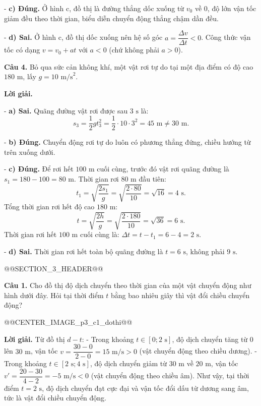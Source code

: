\documentclass[11pt,a4paper]{article}
\begin{document}
- \textbf{c) Đúng.} Ở hình c, đồ thị là đường thẳng dốc xuống từ $v_0$ về 0, độ lớn vận tốc giảm đều theo thời gian, biểu diễn chuyển động thẳng chậm dần đều.

- \textbf{d) Sai.} Ở hình c, đồ thị dốc xuống nên hệ số góc $a = \dfrac{\Delta v}{\Delta t} < 0$. Công thức vận tốc có dạng $v = v_0 + at$ với $a < 0$ (chứ không phải $a > 0$).

\textbf{Câu 4.} Bỏ qua sức cản không khí, một vật rơi tự do tại một địa điểm có độ cao $180\text{ m}$, lấy $g = 10\text{ m/s}^2$.

\textbf{Lời giải.} 

- \textbf{a) Sai.} Quãng đường vật rơi được sau $3\text{ s}$ là:
\[
s_3 = \frac{1}{2}gt_3^2 = \frac{1}{2} \cdot 10 \cdot 3^2 = 45\text{ m} \ne 30\text{ m}.
\]

- \textbf{b) Đúng.} Chuyển động rơi tự do luôn có phương thẳng đứng, chiều hướng từ trên xuống dưới.

- \textbf{c) Đúng.} Để rơi hết $100\text{ m}$ cuối cùng, trước đó vật rơi quãng đường là $s_1 = 180 - 100 = 80\text{ m}$.
Thời gian rơi $80\text{ m}$ đầu tiên:
\[
t_1 = \sqrt{\frac{2s_1}{g}} = \sqrt{\frac{2 \cdot 80}{10}} = \sqrt{16} = 4\text{ s}.
\]
Tổng thời gian rơi hết độ cao $180\text{ m}$:
\[
t = \sqrt{\frac{2h}{g}} = \sqrt{\frac{2 \cdot 180}{10}} = \sqrt{36} = 6\text{ s}.
\]
Thời gian rơi hết $100\text{ m}$ cuối cùng là: $\Delta t = t - t_1 = 6 - 4 = 2\text{ s}$.

- \textbf{d) Sai.} Thời gian rơi hết toàn bộ quãng đường là $t = 6\text{ s}$, không phải $9\text{ s}$.

@@SECTION_3_HEADER@@

\textbf{Câu 1.} Cho đồ thị độ dịch chuyển theo thời gian của một vật chuyển động như hình dưới đây. Hỏi tại thời điểm $t$ bằng bao nhiêu giây thì vật đổi chiều chuyển động?

@@CENTER_IMAGE_p3_c1_dothi@@

\textbf{Lời giải.} Từ đồ thị $d - t$:
- Trong khoảng $t \in [0; 2\text{ s}]$, độ dịch chuyển tăng từ $0$ lên $30\text{ m}$, vận tốc $v = \dfrac{30 - 0}{2 - 0} = 15\text{ m/s} > 0$ (vật chuyển động theo chiều dương).
- Trong khoảng $t \in [2\text{ s}; 4\text{ s}]$, độ dịch chuyển giảm từ $30\text{ m}$ về $20\text{ m}$, vận tốc $v' = \dfrac{20 - 30}{4 - 2} = -5\text{ m/s} < 0$ (vật chuyển động theo chiều âm).
Như vậy, tại thời điểm $t = 2\text{ s}$, độ dịch chuyển đạt cực đại và vận tốc đổi dấu từ dương sang âm, tức là vật đổi chiều chuyển động.
\end{document}
